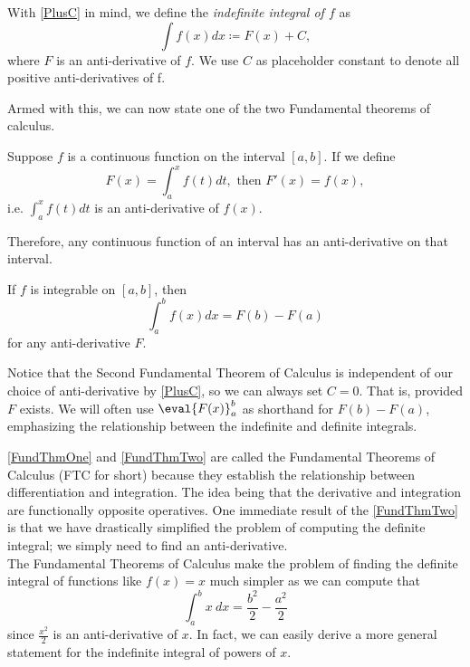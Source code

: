 \begin{defn}
With \cref{PlusC} in mind, we define the \emph{indefinite integral of $f$} as
\begin{equation}
  \int f(x)dx\coloneqq F(x)+C,
\end{equation} where $F$ is an anti-derivative of $f$. We use $C$ as placeholder constant to denote all positive anti-derivatives of f.
\end{defn}

Armed with this, we can now state one of the two Fundamental theorems of calculus.

\begin{thm}\label{FundThmOne}
  Suppose $f$ is a continuous function on the interval $[a,b]$. If we define \begin{equation}
    F(x)=\int_{a}^x f(t)dt,\text{ then } F'(x)=f(x),
  \end{equation}
  i.e. $\int_{a}^x f(t)dt$ is an anti-derivative of $f(x)$.
\end{thm}
Therefore, any continuous function of an interval has an anti-derivative on that interval.
\begin{thm}\label{FundThmTwo} If $f$ is integrable on $[a,b]$, then \begin{equation}\label{FTC2}
  \int_{a}^{b}f(x)dx=F(b)-F(a)
\end{equation}for any anti-derivative $F$.
\end{thm}
\begin{rem}
  Notice that the Second Fundamental Theorem of Calculus is independent of our choice of anti-derivative by \cref{PlusC}, so we can always set $C=0$. That is, provided $F$ exists. We will often use $\eval{F(x)}_{a}^{b}$ as shorthand for $F(b)-F(a)$, emphasizing the relationship between the indefinite and definite integrals.
\end{rem}

\cref{FundThmOne} and \cref{FundThmTwo} are called the Fundamental Theorems of Calculus (FTC for short) because they establish the relationship between differentiation and integration. The idea being that the derivative and integration are functionally opposite operatives. One immediate result of the \cref{FundThmTwo} is that we have drastically simplified the problem of computing the definite integral; we simply need to find an anti-derivative.\\

The Fundamental Theorems of Calculus make the problem of finding the definite integral of functions like $f(x)=x$ much simpler as we can compute that
\begin{equation}
  \int_{a}^{b}x\ dx=\frac{b^2}{2}-\frac{a^2}{2}
\end{equation}
since $\frac{x^2}{2}$ is an anti-derivative of $x$. In fact, we can easily derive a more general statement for the indefinite integral of powers of $x$.

